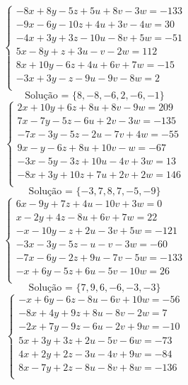 \documentclass[12pt,oneside,a4paper]{article}
\begin{document}
\vspace{\baselineskip}
\begin{equation*}
\begin{cases}
-8x+8y-5z+5u+8v-3w=-133 \\
-9x-6y-10z+4u+3v-4w=30 \\
-4x+3y+3z-10u-8v+5w=-51 \\
5x-8y+z+3u-v-2w=112 \\
8x+10y-6z+4u+6v+7w=-15 \\
-3x+3y-z-9u-9v-8w=2 \\
\end{cases}
\end{equation*}
\begin{equation*}
\text{Solução = }\{8,-8,-6,2,-6,-1\}
\end{equation*}
\vspace{\baselineskip}
\begin{equation*}
\begin{cases}
2x+10y+6z+8u+8v-9w=209 \\
7x-7y-5z-6u+2v-3w=-135 \\
-7x-3y-5z-2u-7v+4w=-55 \\
9x-y-6z+8u+10v-w=-67 \\
-3x-5y-3z+10u-4v+3w=13 \\
-8x+3y+10z+7u+2v+2w=146 \\
\end{cases}
\end{equation*}
\begin{equation*}
\text{Solução = }\{-3,7,8,7,-5,-9\}
\end{equation*}
\vspace{\baselineskip}
\begin{equation*}
\begin{cases}
6x-9y+7z+4u-10v+3w=0 \\
x-2y+4z-8u+6v+7w=22 \\
-x-10y-z+2u-3v+5w=-121 \\
-3x-3y-5z-u-v-3w=-60 \\
-7x-6y-2z+9u-7v-5w=-133 \\
-x+6y-5z+6u-5v-10w=26 \\
\end{cases}
\end{equation*}
\begin{equation*}
\text{Solução = }\{7,9,6,-6,-3,-3\}
\end{equation*}
\vspace{\baselineskip}
\begin{equation*}
\begin{cases}
-x+6y-6z-8u-6v+10w=-56 \\
-8x+4y+9z+8u-8v-2w=7 \\
-2x+7y-9z-6u-2v+9w=-10 \\
5x+3y+3z+2u-5v-6w=-73 \\
4x+2y+2z-3u-4v+9w=-84 \\
8x-7y+2z-8u-8v+8w=-136 \\
\end{cases}
\end{equation*}
\end{document}
